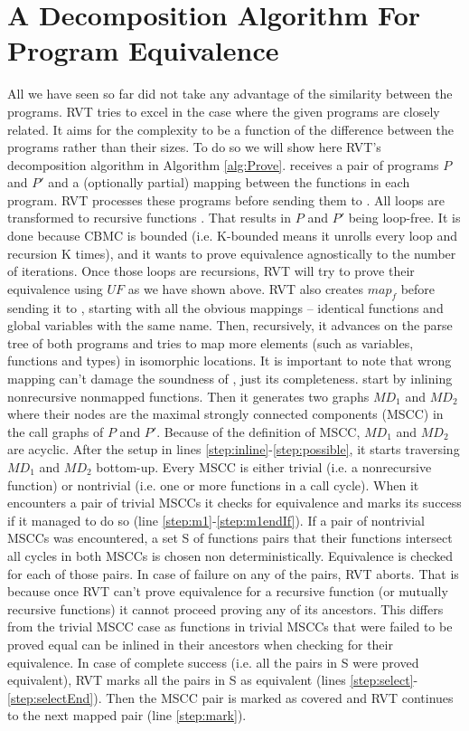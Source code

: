 \section{A Decomposition Algorithm For Program Equivalence}
All we have seen so far did not take any advantage of the similarity between the programs. RVT tries to excel in the case where the given programs are closely related. It aims for the complexity to be a function of the difference between the programs rather than their sizes. To do so we will show here RVT's decomposition algorithm in Algorithm \ref{alg:Prove}.  receives a pair of programs $P$ and $P'$ and a (optionally partial) mapping between the functions in each program. RVT processes these programs before sending them to . All loops are transformed to recursive functions \cite{DBLP:conf/vstte/StrichmanG05}. That results in $P$ and $P'$ being loop-free. It is done because CBMC is bounded (i.e. K-bounded means it unrolls every loop and recursion K times), and it wants to prove equivalence agnostically to the number of iterations. Once those loops are recursions, RVT will try to prove their equivalence using $UF$ as we have shown above. RVT also creates $map_f$ before sending it to , starting with all the obvious mappings – identical functions and global variables with the same name. Then, recursively, it advances on the parse tree of both programs and tries to map more elements (such as variables, functions and types) in isomorphic locations. It is important to note that wrong mapping can't damage the soundness of , just its completeness. 
 start by inlining nonrecursive nonmapped functions. Then it generates two graphs $MD_1$ and $MD_2$ where their nodes are the maximal strongly connected components (MSCC) in the call graphs of $P$ and $P'$. Because of the definition of MSCC, $MD_1$ and $MD_2$ are acyclic. After the setup in lines \ref{step:inline}-\ref{step:possible}, it starts traversing $MD_1$ and $MD_2$ bottom-up. Every MSCC is either trivial (i.e. a nonrecursive function) or nontrivial (i.e. one or more functions in a call cycle). When it encounters a pair of trivial MSCCs it checks for equivalence and marks its success if it managed to do so (line \ref{step:m1}-\ref{step:m1endIf}). If a pair of nontrivial MSCCs was encountered, a set S of functions pairs that their functions intersect all cycles in both MSCCs is chosen non deterministically. Equivalence is checked for each of those pairs. In case of failure on any of the pairs, RVT aborts. That is because once RVT can't prove equivalence for a recursive function (or mutually recursive functions) it cannot proceed proving any of its ancestors. This differs from the trivial MSCC case as functions in trivial MSCCs that were failed to be proved equal can be inlined in their ancestors when checking for their equivalence. In case of complete success (i.e. all the pairs in S were proved equivalent), RVT marks all the pairs in S as equivalent (lines \ref{step:select}-\ref{step:selectEnd}). Then the MSCC pair is marked as covered and RVT continues to the next mapped pair (line \ref{step:mark}).

